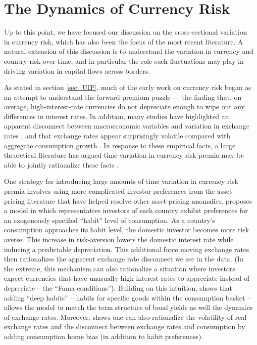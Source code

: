 \documentclass{ar-1col}
\begin{document}
\section{The Dynamics of Currency Risk\label{sec_dynamics}}

Up to this point, we have focused our discussion on the cross-sectional variation in currency risk, which has also been the focus of the most recent literature. A natural extension of this discussion is to understand the variation in currency and country risk over time, and in particular the role such fluctuations may play in driving variation in capital flows across borders.

As stated in section \ref{sec_UIP}, much of the early work on currency risk began as an attempt to understand the forward premium puzzle --- the finding that, on average, high-interest-rate currencies do not depreciate enough to wipe out any differences in interest rates. In addition, many studies have highlighted an apparent disconnect between macroeconomic variables and variation in exchange rates \citep{MeeseRogoff1983}, and that exchange rates appear surprisingly volatile compared with aggregate consumption growth \citep{BackusSmith1993}. In response to these empirical facts, a large theoretical literature has argued time variation in currency risk premia may be able to jointly rationalize these facts \citep{Fama1984,Backusetal2001}.

One strategy for introducing large amounts of time variation in currency risk premia involves using more complicated investor preferences from the asset-pricing literature that have helped resolve other asset-pricing anomalies. \citet{Verdelhan2010} proposes a model in which representative investors of each country exhibit preferences for an exogenously specified ``habit'' level of consumption. As a country's consumption approaches its habit level, the domestic investor becomes more risk averse. This increase in risk-aversion lowers the domestic interest rate while inducing a predictable depreciation. This additional force moving exchange rates then rationalizes the apparent exchange rate disconnect we see in the data. (In the extreme, this mechanism can also rationalize a situation where investors expect currencies that have unusually high interest rates to appreciate instead of depreciate -- the ``Fama conditions'').  Building on this intuition, \citet{Heyerdahl-Larsen2011} shows that adding ``deep habits'' -- habits for specific goods within the consumption basket -- allows the model to match the term structure of bond yields as well the dynamics of exchange rates. Moreover, \citet{Stathopoulos2017} shows one can also rationalize the volatility of real exchange rates and the disconnect between exchange rates and consumption by adding consumption home bias (in addition to habit preferences). 
\end{document}
